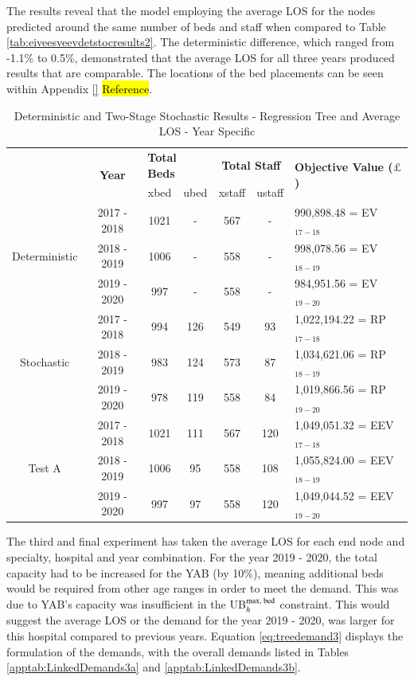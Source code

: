 \documentclass[../thesis.tex]{subfiles}
\begin{document}
The results reveal that the model employing the average LOS for the nodes predicted around the same number of beds and staff when compared to Table \ref{tab:eiveesveevdetstocresults2}. The deterministic difference, which ranged from -1.1\% to 0.5\%, demonstrated that the average LOS for all three years produced results that are comparable. The locations of the bed placements can be seen within Appendix \ref{} \hl{Reference}.

\begin{table}[h!]
    \centering
    \begin{tabular}{ccccccl}\toprule
 & \multirow{2}{*}{\textbf{Year}}& \multicolumn{2}{l}{\textbf{Total Beds}} & \multicolumn{2}{c}{\textbf{Total Staff}} & \multirow{2}{*}{\textbf{Objective Value ($\pounds$)}}\\ \cmidrule(lr){3-4} \cmidrule(lr){5-6}
&& xbed           & ubed          & xstaff         & ustaff         \\ \midrule
     \multirow{3}{*}{Deterministic} & 2017 - 2018 & 1021  & - & 567  & - &  990,898.48
 =  EV$_{17-18}$ \\ 
      & 2018 - 2019 & 1006 & - & 558 & - & 998,078.56 =  EV$_{18-19}$ \\
      & 2019 - 2020 & 997 & - & 558 & - &  984,951.56 =  EV$_{19-20}$\\ \midrule
     \multirow{3}{*}{Stochastic} & 2017 - 2018 & 994 & 126 & 549 & 93 & 1,022,194.22 =  RP$_{17-18}$ \\ 
      & 2018 - 2019 & 983 & 124 & 573 & 87 &1,034,621.06 =  RP$_{18-19}$ \\
      & 2019 - 2020 & 978 & 119 &558 & 84&  1,019,866.56 =  RP$_{19-20}$\\ \midrule    
     \multirow{3}{*}{Test A} & 2017 - 2018 & 1021 & 111 &  567 & 120 & 1,049,051.32 =  EEV$_{17-18}$ \\ 
      & 2018 - 2019& 1006 & 95 & 558 & 108 & 1,055,824.00 =  EEV$_{18-19}$ \\
      & 2019 - 2020 & 997 & 97 & 558 & 120 & 1,049,044.52 =  EEV$_{19-20}$\\ \bottomrule       
    \end{tabular}
    \caption{Deterministic and Two-Stage Stochastic Results - Regression Tree and Average LOS - Year Specific}
    \label{tab:Results2}
\end{table}

The third and final experiment has taken the average LOS for each end node and specialty, hospital and year combination. For the year 2019 - 2020, the total capacity had to be increased for the YAB (by 10\%), meaning additional beds would be required from other age ranges in order to meet the demand. This was due to YAB's capacity was insufficient in the UB$_{h}^{\textnormal{max, bed}}$ constraint. This would suggest the average LOS or the demand for the year 2019 - 2020, was larger for this hospital compared to previous years. Equation \eqref{eq:treedemand3} displays the formulation of the demands, with the overall demands listed in Tables \ref{apptab:LinkedDemands3a} and \ref{apptab:LinkedDemands3b}.
\end{document}
